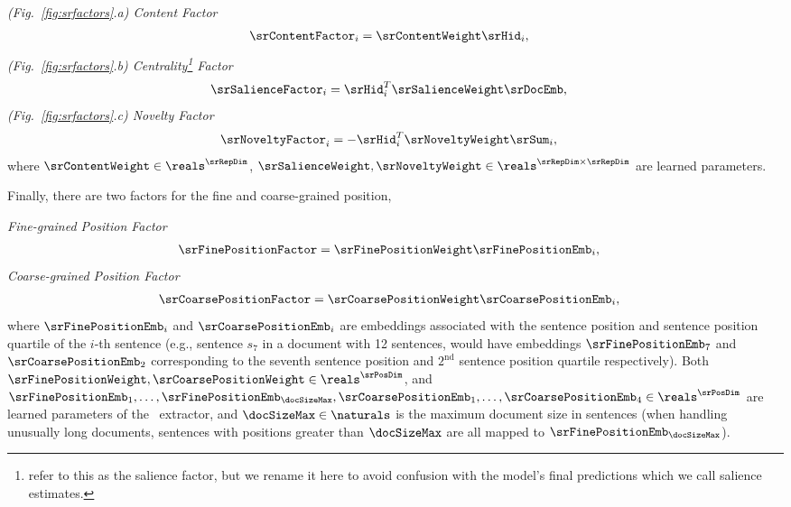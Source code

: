 \vspace{10pt}
\noindent \textit{(Fig.~\ref{fig:srfactors}.a) Content Factor} 
\begin{align}
    \srContentFactor_i &=\srContentWeight \srHid_i, 
\end{align}
\vspace{10pt}   \noindent \textit{(Fig.~\ref{fig:srfactors}.b) Centrality\footnote{\citet{nallapati2017summarunner} refer to this as the salience factor, but we rename it here to avoid confusion with the model's final predictions which we call salience estimates.} Factor}
\begin{align}
    \srSalienceFactor_i & = \srHid_i^T\srSalienceWeight \srDocEmb, 
\end{align}
\vspace{10pt} \noindent \textit{(Fig.~\ref{fig:srfactors}.c) Novelty Factor}
\begin{align}
    \srNoveltyFactor_i &= -\srHid_i^T \srNoveltyWeight \srSum_i, \label{eq:srnov} 
\end{align}
where $\srContentWeight \in \reals^{\srRepDim}$, $\srSalienceWeight,\srNoveltyWeight \in \reals^{\srRepDim \times \srRepDim}$ are learned parameters.

Finally, there are two factors for the fine and coarse-grained position,

\vspace{10pt} 
\noindent\textit{%
Fine-grained Position Factor}
\begin{align}
       \srFinePositionFactor& = \srFinePositionWeight \srFinePositionEmb_i, 
\end{align}
\vspace{10pt} \textit{%
Coarse-grained Position Factor}
\begin{align}
           \srCoarsePositionFactor& = \srCoarsePositionWeight \srCoarsePositionEmb_i, 
\end{align}
where $\srFinePositionEmb_i$ and $\srCoarsePositionEmb_i$ are embeddings associated with the sentence position and sentence position quartile of the $i$-th 
sentence (e.g., sentence $s_7$ in a document with 12 sentences, would have 
embeddings $\srFinePositionEmb_7$ and $\srCoarsePositionEmb_2$ corresponding
to the seventh sentence position and $2^\textrm{nd}$ sentence position
quartile respectively).
Both $\srFinePositionWeight, \srCoarsePositionWeight \in \reals^{\srPosDim}$, and $\srFinePositionEmb_1,\ldots,\srFinePositionEmb_\docSizeMax,\srCoarsePositionEmb_1,\ldots,\srCoarsePositionEmb_4 \in \reals^{\srPosDim}$ are learned parameters of the \srext~extractor, and $\docSizeMax\in\naturals$ is the maximum
document size in sentences (when handling unusually long documents, sentences
with positions greater than $\docSizeMax$ are all mapped to $\srFinePositionEmb_\docSizeMax$).

